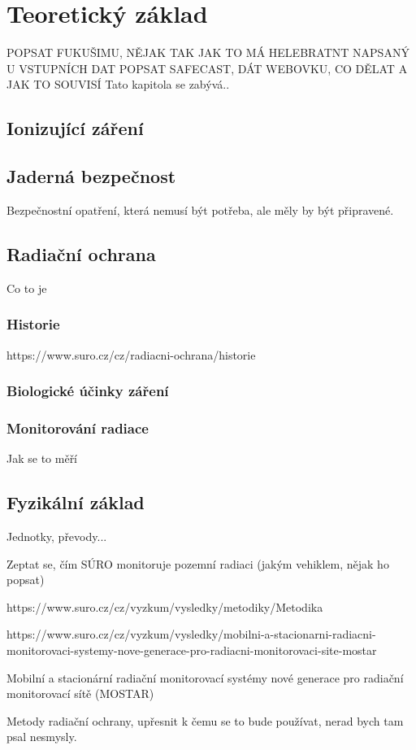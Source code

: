 \chapter{Teoretický základ}
\label{2-teorie}
POPSAT FUKUŠIMU, NĚJAK TAK JAK TO MÁ HELEBRATNT NAPSANÝ U VSTUPNÍCH DAT
POPSAT SAFECAST, DÁT WEBOVKU, CO DĚLAT A JAK TO SOUVISÍ
Tato kapitola se zabývá..
\section{Ionizující záření}

\section{Jaderná bezpečnost}
Bezpečnostní opatření, která nemusí být potřeba, ale měly by být připravené.

\section{Radiační ochrana}
Co to je
\subsection{Historie}
https://www.suro.cz/cz/radiacni-ochrana/historie
\subsection{Biologické účinky záření}

\subsection{Monitorování radiace}
Jak se to měří

\section{Fyzikální základ}

Jednotky, převody...







Zeptat se, čím SÚRO monitoruje pozemní radiaci (jakým vehiklem, nějak ho popsat)

https://www.suro.cz/cz/vyzkum/vysledky/metodiky/Metodika%

https://www.suro.cz/cz/vyzkum/vysledky/mobilni-a-stacionarni-radiacni-monitorovaci-systemy-nove-generace-pro-radiacni-monitorovaci-site-mostar

Mobilní a stacionární radiační monitorovací systémy nové generace pro radiační monitorovací sítě (MOSTAR)

Metody radiační ochrany, upřesnit k čemu se to bude používat, nerad bych tam psal nesmysly.